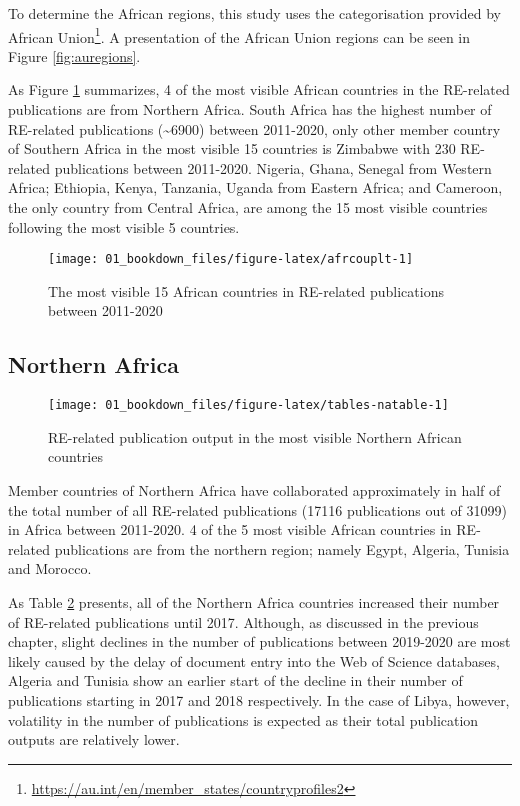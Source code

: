 \documentclass[12pt,twoside]{report}
\let\rmarkdownfootnote\footnote%
\def\footnote{\protect\rmarkdownfootnote}
\renewcommand{\href}[2]{#2\footnote{\url{#1}}}
\begin{document}
To determine the African regions, this study uses \href{https://au.int/en/member_states/countryprofiles2}{the categorisation provided by African Union}. A presentation of the African Union regions can be seen in Figure \ref{fig:auregions}.

As Figure \ref{fig:afrcouplt} summarizes, 4 of the most visible African countries in the RE-related publications are from Northern Africa. South Africa has the highest number of RE-related publications (\textasciitilde6900) between 2011-2020, only other member country of Southern Africa in the most visible 15 countries is Zimbabwe with 230 RE-related publications between 2011-2020. Nigeria, Ghana, Senegal from Western Africa; Ethiopia, Kenya, Tanzania, Uganda from Eastern Africa; and Cameroon, the only country from Central Africa, are among the 15 most visible countries following the most visible 5 countries.

\begin{figure}
\texttt{[image: 01\_bookdown\_files/figure-latex/afrcouplt-1]} \caption{The most visible 15 African countries in  RE-related publications between 2011-2020}\label{fig:afrcouplt}
\end{figure}

\hypertarget{northern-africa}{%
\subsection{Northern Africa}\label{northern-africa}}

\begin{figure}
\texttt{[image: 01\_bookdown\_files/figure-latex/tables-natable-1]} \caption{RE-related publication output in the most visible Northern African countries}\label{fig:tables-natable}
\end{figure}

Member countries of Northern Africa have collaborated approximately in half of
the total number of all RE-related publications (17116 publications out of 31099) in Africa between 2011-2020. 4 of the 5 most visible African countries in RE-related publications are from the
northern region; namely Egypt, Algeria, Tunisia and Morocco.

As Table \ref{fig:tables-natable}
presents, all of the Northern Africa countries increased their number of RE-related
publications until 2017. Although, as discussed in the previous chapter, slight declines in the number of publications between 2019-2020 are most likely caused by the delay of document entry into the Web of Science databases, Algeria and Tunisia show an earlier start of
the decline in their number of publications starting in 2017 and 2018 respectively. In the
case of Libya, however, volatility in the number of publications
is expected as their total publication outputs are relatively lower.
\end{document}
